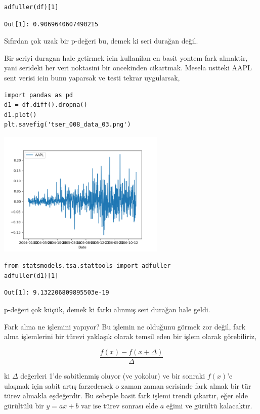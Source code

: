 \documentclass[12pt,fleqn]{article}\usepackage{../../common}
\begin{document}
\begin{verbatim}
adfuller(df)[1]
\end{verbatim}

\begin{verbatim}
Out[1]: 0.9069640607490215
\end{verbatim}

Sıfırdan çok uzak bir p-değeri bu, demek ki seri durağan değil.

Bir seriyi duragan hale getirmek icin kullanilan en basit yontem fark
almaktir, yani serideki her veri noktasini bir oncekinden cikartmak. Mesela
ustteki AAPL sent verisi icin bunu yaparsak ve testi tekrar uygularsak,

\begin{verbatim}
import pandas as pd
d1 = df.diff().dropna()
d1.plot()
plt.savefig('tser_008_data_03.png')
\end{verbatim}

\includegraphics[height=6cm]{tser_008_data_03.png}

\begin{verbatim}
from statsmodels.tsa.stattools import adfuller
adfuller(d1)[1]
\end{verbatim}

\begin{verbatim}
Out[1]: 9.132206809895503e-19
\end{verbatim}

p-değeri çok küçük, demek ki farkı alınmış seri durağan hale geldi.

Fark alma ne işlemini yapıyor? Bu işlemin ne olduğunu görmek zor değil, fark
alma işlemlerini bir türevi yaklaşık olarak temsil eden bir işlem olarak
görebiliriz, 

$$
\frac{f(x)-f(x+\Delta)}{\Delta}
$$

ki $\Delta$ değerleri 1'de sabitlenmiş oluyor (ve yokolur) ve bir sonraki
$f(x)$'e ulaşmak için sabit artış farzedersek o zaman zaman serisinde fark almak
bir tür türev almakla eşdeğerdir. Bu sebeple basit fark işlemi trendi çıkartır,
eğer elde gürültülü bir $y = ax + b$ var ise türev sonrası elde $a$ eğimi
ve gürültü kalacaktır.
\end{document}
